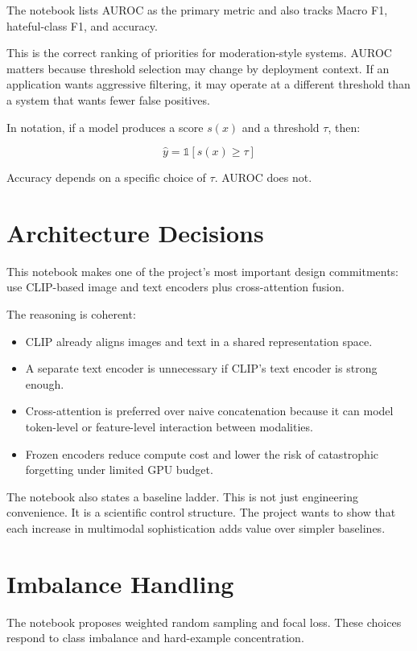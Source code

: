 \documentclass[11pt,a4paper]{report}
\begin{document}
The notebook lists AUROC as the primary metric and also tracks Macro F1, hateful-class F1, and accuracy.

This is the correct ranking of priorities for moderation-style systems. AUROC matters because threshold selection may change by deployment context. If an application wants aggressive filtering, it may operate at a different threshold than a system that wants fewer false positives.

In notation, if a model produces a score $s(x)$ and a threshold $\tau$, then:

\[
\hat{y} = \mathbb{1}[s(x) \geq \tau]
\]

Accuracy depends on a specific choice of $\tau$. AUROC does not.

\section{Architecture Decisions}

This notebook makes one of the project's most important design commitments: use CLIP-based image and text encoders plus cross-attention fusion.

The reasoning is coherent:

\begin{itemize}
\item CLIP already aligns images and text in a shared representation space.
\item A separate text encoder is unnecessary if CLIP's text encoder is strong enough.
\item Cross-attention is preferred over naive concatenation because it can model token-level or feature-level interaction between modalities.
\item Frozen encoders reduce compute cost and lower the risk of catastrophic forgetting under limited GPU budget.
\end{itemize}

The notebook also states a baseline ladder. This is not just engineering convenience. It is a scientific control structure. The project wants to show that each increase in multimodal sophistication adds value over simpler baselines.

\section{Imbalance Handling}

The notebook proposes weighted random sampling and focal loss. These choices respond to class imbalance and hard-example concentration.
\end{document}
